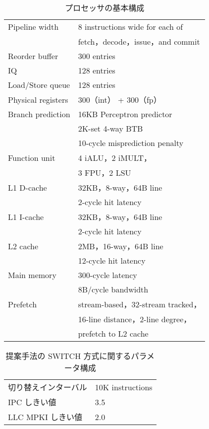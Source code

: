 \begin{table}[htb]
  \caption{プロセッサの基本構成}
  \footnotesize
  \center
    \begin{tabular}{l|l} \hline \hline
     Pipeline width & 8 instructions wide for each of \\
     & fetch，decode，issue，and commit \\
     Reorder buffer & 300 entries \\
     IQ & 128 entries \\
     Load/Store queue & 128 entries \\
     Physical registers & 300（int） + 300（fp） \\
     Branch prediction & 16KB Perceptron predictor~\cite{Jimenez2001} \\
     & 2K-set 4-way BTB \\
     & 10-cycle misprediction penalty \\
     Function unit & 4 iALU，2 iMULT，\\
     &  3 FPU，2 LSU \\
     L1 D-cache & 32KB，8-way，64B line \\
      & 2-cycle hit latency \\
     L1 I-cache & 32KB，8-way，64B line \\
      &  2-cycle hit latency \\
     L2 cache & 2MB，16-way，64B line \\
      & 12-cycle hit latency \\  
     Main memory & 300-cycle latency \\
     & 8B/cycle bandwidth \\ 
     Prefetch & stream-based，32-stream tracked， \\ 
     & 16-line distance，2-line degree，\\
     & prefetch to L2 cache \\ \hline
  \end{tabular}
  \label{tab:base_config}
\end{table}

\begin{table}[tb]
  \caption{提案手法の SWITCH 方式に関するパラメータ構成}
  \footnotesize
  \center
    \begin{tabular}{l|l} \hline \hline
    切り替えインターバル & 10K instructions \\
    IPC しきい値 & 3.5 \\
    LLC MPKI しきい値 & 2.0 \\ \hline 
  \end{tabular}
  \label{tab:switch_config}
\end{table}

